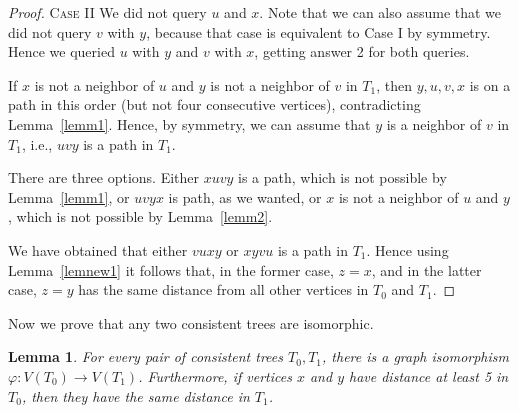 \documentclass[12pt,a4paper]{amsart}
\theoremstyle{plain}
\newtheorem{lemma}[theorem]{Lemma}
\theoremstyle{definition}
\begin{document}
\begin{proof}
\textsc{Case II}  We did not query $u$ and $x$. Note that we can also assume that we did not query $v$ with $y$, because that case is equivalent to Case I by symmetry. Hence we queried $u$ with $y$ and $v$ with $x$, getting answer 2 for both queries. 

If $x$ is not a neighbor of $u$ and $y$ is not a neighbor of $v$ in $T_1$, then $y,u,v,x$ is on a path in this order (but not four consecutive vertices), contradicting Lemma~\ref{lemm1}. Hence, by symmetry, we can assume that $y$ is a neighbor of $v$ in $T_1$, i.e., $uvy$ is a path in $T_1$. 

There are three options. Either $xuvy$ is a path, which is not possible by Lemma~\ref{lemm1}, or $uvyx$ is path, as we wanted, or $x$ is not a neighbor of $u$ and $y$, which is not possible by Lemma~\ref{lemm2}.

We have obtained that either $vuxy$ or $xyvu$ is a path in $T_1$. Hence using Lemma~\ref{lemnew1} it follows that, in the former case, $z=x$, and in the latter case, $z=y$ has the same distance from all other vertices in $T_0$ and $T_1$.
\end{proof}

Now we prove that any two consistent trees are isomorphic. 

\begin{lemma}\label{lem:isom}
    For every pair of consistent trees $T_0, T_1$, there is a graph isomorphism $\varphi \colon V(T_0) \to V(T_1)$. Furthermore, if vertices $x$ and $y$ have distance at least 5 in $T_0$, then they have the same distance in $T_1$.
\end{lemma}
\end{document}
